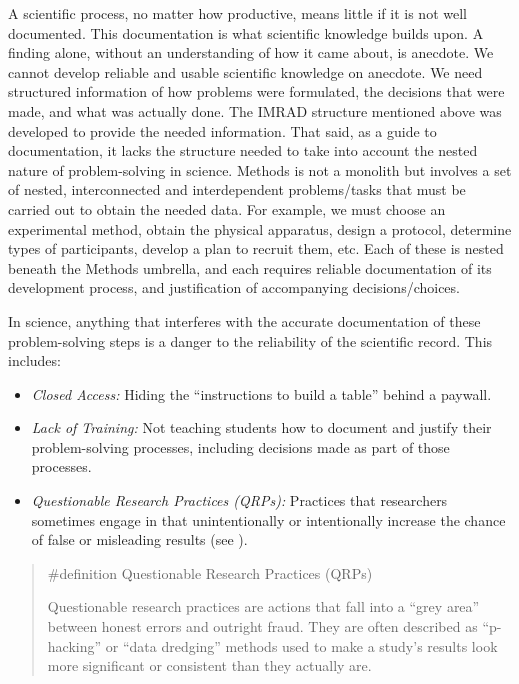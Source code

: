 \documentclass[
  letterpaper,
]{book}
\providecommand{\tightlist}{%
  \setlength{\itemsep}{0pt}\setlength{\parskip}{0pt}}\usepackage{longtable,booktabs,array}
\begin{document}
A scientific process, no matter how productive, means little if it is
not well documented. This documentation is what scientific knowledge
builds upon. A finding alone, without an understanding of how it came
about, is anecdote. We cannot develop reliable and usable scientific
knowledge on anecdote. We need structured information of how problems
were formulated, the decisions that were made, and what was actually
done. The IMRAD structure mentioned above was developed to provide the
needed information. That said, as a guide to documentation, it lacks the
structure needed to take into account the nested nature of
problem-solving in science. Methods is not a monolith but involves a set
of nested, interconnected and interdependent problems/tasks that must be
carried out to obtain the needed data. For example, we must choose an
experimental method, obtain the physical apparatus, design a protocol,
determine types of participants, develop a plan to recruit them, etc.
Each of these is nested beneath the Methods umbrella, and each requires
reliable documentation of its development process, and justification of
accompanying decisions/choices.

In science, anything that interferes with the accurate documentation of
these problem-solving steps is a danger to the reliability of the
scientific record. This includes:

\begin{itemize}
\tightlist
\item
  \emph{Closed Access:} Hiding the ``instructions to build a table''
  behind a paywall.
\item
  \emph{Lack of Training:} Not teaching students how to document and
  justify their problem-solving processes, including decisions made as
  part of those processes.
\item
  \emph{Questionable Research Practices (QRPs):} Practices that
  researchers sometimes engage in that unintentionally or intentionally
  increase the chance of false or misleading results (see
  ).
\end{itemize}

\begin{quote}
\label{def-qrps}{\#definition} Questionable Research
Practices (QRPs)

Questionable research practices are actions that fall into a ``grey
area'' between honest errors and outright fraud. They are often
described as ``p-hacking'' or ``data dredging'' methods used to make a
study's results look more significant or consistent than they actually
are.
\end{quote}
\end{document}
